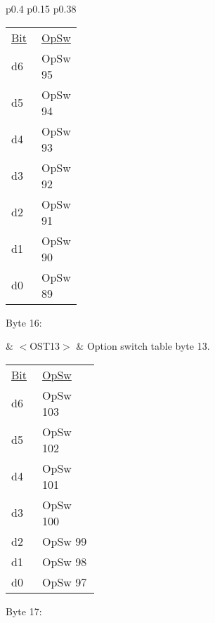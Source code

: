 \begin{tabular}{p{0.4\linewidth} p{0.15\linewidth} p{0.38\linewidth}} 

\begin{tabular}{|p{0.3cm}|p{0.3cm}|p{0.3cm}|p{0.3cm}|p{0.3cm}|p{0.3cm}|p{0.3cm}|p{0.3cm}|}
\hline
0 & d6 & d5 & d4 & d3 & d2 & d1 & d0\\
\hline
\end{tabular}
& $<$OST12$>$ & Option switch table byte 12.\\
\end{tabular}

\begin{tabular}{p{0.05\linewidth} p{0.2\linewidth} } 
\underline{Bit} & \underline{OpSw} \\
d6 & OpSw 95\\
d5 & OpSw 94\\
d4 & OpSw 93\\
d3 & OpSw 92\\
d2 & OpSw 91\\
d1 & OpSw 90\\
d0 & OpSw 89\\
\end{tabular}

Byte 16:

& $<$OST13$>$ & Option switch table byte 13.\\
\end{tabular}

\begin{tabular}{p{0.05\linewidth} p{0.2\linewidth} } 
\underline{Bit} & \underline{OpSw} \\
d6 & OpSw 103\\
d5 & OpSw 102\\
d4 & OpSw 101\\
d3 & OpSw 100\\
d2 & OpSw 99\\
d1 & OpSw 98\\
d0 & OpSw 97\\
\end{tabular}

Byte 17:


